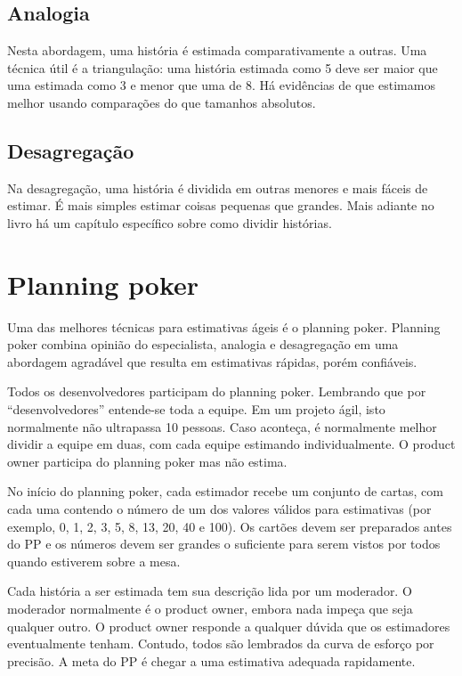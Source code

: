 \documentclass[a4paper,abntfigtabnum,noindentfirst]{abnt}
\begin{document}
\subsection{Analogia}

Nesta abordagem, uma história é estimada comparativamente a outras. Uma técnica útil é a triangulação: uma história estimada como 5 deve ser maior que uma estimada como 3 e menor que uma de 8. Há evidências de que estimamos melhor usando comparações do que tamanhos absolutos.

\subsection{Desagregação}

Na desagregação, uma história é dividida em outras menores e mais fáceis de estimar. É mais simples estimar coisas pequenas que grandes. Mais adiante no livro há um capítulo específico sobre como dividir histórias.


\section{Planning poker}

Uma das melhores técnicas para estimativas ágeis é o planning poker. Planning poker combina opinião do especialista, analogia e desagregação em uma abordagem agradável que resulta em estimativas rápidas, porém confiáveis.

Todos os desenvolvedores participam do planning poker. Lembrando que por ``desenvolvedores'' entende-se toda a equipe. Em um projeto ágil, isto normalmente não ultrapassa 10 pessoas. Caso aconteça, é normalmente melhor dividir a equipe em duas, com cada equipe estimando individualmente. O product owner participa do planning poker mas não estima.

No início do planning poker, cada estimador recebe um conjunto de cartas, com cada uma contendo o número de um dos valores válidos para estimativas (por exemplo, 0, 1, 2, 3, 5, 8, 13, 20, 40 e 100). Os cartões devem ser preparados antes do PP e os números devem ser grandes o suficiente para serem vistos por todos quando estiverem sobre a mesa.

Cada história a ser estimada tem sua descrição lida por um moderador. O moderador normalmente é o product owner, embora nada impeça que seja qualquer outro. O product owner responde a qualquer dúvida que os estimadores eventualmente tenham. Contudo, todos são lembrados da curva de esforço por precisão. A meta do PP é chegar a uma estimativa adequada rapidamente.
\end{document}
